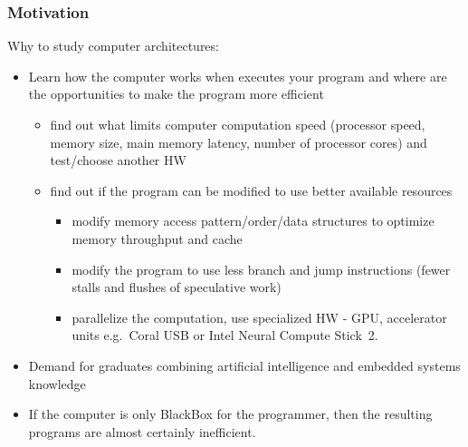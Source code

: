 \documentclass{beamer}
\begin{document}
\begin{frame}
\frametitle{Motivation}
Why to study computer architectures:
\begin{itemize}
\item Learn how the computer works when executes your program and where are the opportunities to make the program more efficient
  \begin{itemize}
  \item find out what limits computer computation speed (processor speed, memory size, main memory latency, number of processor cores) and test/choose another HW
  \item find out if the program can be modified to use better available resources
  \begin{itemize}
    \item modify memory access pattern/order/data structures to optimize memory throughput and cache
    \item modify the program to use less branch and jump instructions (fewer stalls and flushes of speculative work)
    \item parallelize the computation, use specialized HW - GPU, accelerator units e.g.\ Coral USB or Intel Neural Compute Stick~2.
  \end{itemize}
\end{itemize}
\item Demand for graduates combining artificial intelligence and embedded systems knowledge
\item If the computer is only BlackBox for the programmer, then the resulting programs are almost certainly inefficient.
\end{itemize}
\end{frame}
\end{document}
